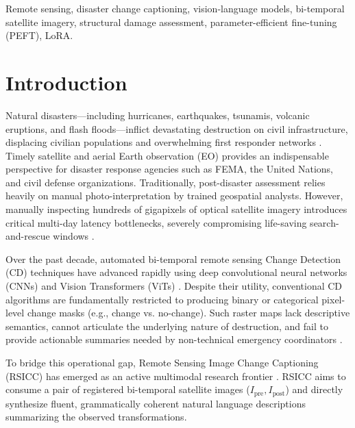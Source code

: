 \documentclass[conference]{IEEEtran}
\begin{document}
\begin{IEEEkeywords}
Remote sensing, disaster change captioning, vision-language models, bi-temporal satellite imagery, structural damage assessment, parameter-efficient fine-tuning (PEFT), LoRA.
\end{IEEEkeywords}

\section{Introduction}
Natural disasters---including hurricanes, earthquakes, tsunamis, volcanic eruptions, and flash floods---inflict devastating destruction on civil infrastructure, displacing civilian populations and overwhelming first responder networks \cite{gupta2019xbd, wang2025disasterm3}. Timely satellite and aerial Earth observation (EO) provides an indispensable perspective for disaster response agencies such as FEMA, the United Nations, and civil defense organizations. Traditionally, post-disaster assessment relies heavily on manual photo-interpretation by trained geospatial analysts. However, manually inspecting hundreds of gigapixels of optical satellite imagery introduces critical multi-day latency bottlenecks, severely compromising life-saving search-and-rescue windows \cite{chen2025rscc}.

Over the past decade, automated bi-temporal remote sensing Change Detection (CD) techniques have advanced rapidly using deep convolutional neural networks (CNNs) and Vision Transformers (ViTs) \cite{liu2022bitemporal, chouaf2023transformer}. Despite their utility, conventional CD algorithms are fundamentally restricted to producing binary or categorical pixel-level change masks (e.g., change vs. no-change). Such raster maps lack descriptive semantics, cannot articulate the underlying nature of destruction, and fail to provide actionable summaries needed by non-technical emergency coordinators \cite{hoxha2022change, tu2023chg2cap}.

To bridge this operational gap, Remote Sensing Image Change Captioning (RSICC) has emerged as an active multimodal research frontier \cite{chang2023prompt, bazi2024rsllava}. RSICC aims to consume a pair of registered bi-temporal satellite images ($I_{\text{pre}}, I_{\text{post}}$) and directly synthesize fluent, grammatically coherent natural language descriptions summarizing the observed transformations. 
\end{document}
